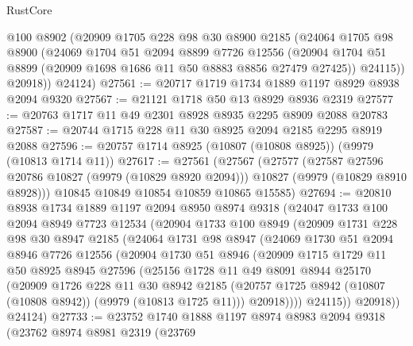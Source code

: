 \begin{lexlean}{RustCore}
\begin{coremodule}
        @100
        @8902
        (@20909
          @1705
          @228
          @98
          @30
          @8900
          @2185
          (@24064
            @1705
            @98
            @8900
            (@24069
              @1704
              @51
              @2094
              @8899
              @7726
              @12556
              (@20904 @1704 @51 @8899 (@20909 @1698 @1686 @11 @50 @8883 @8856 @27479 @27425))
              @24115))
          @20918))
      @24124)
@27561 := @20717 @1719 @1734 @1889 @1197 @8929 @8938 @2094 @9320
@27567 := @21121 @1718 @50 @13 @8929 @8936 @2319
@27577 := @20763 @1717 @11 @49 @2301 @8928 @8935 @2295 @8909 @2088 @20783
@27587 := @20744 @1715 @228 @11 @30 @8925 @2094 @2185 @2295 @8919 @2088
@27596 := @20757 @1714 @8925 (@10807 (@10808 @8925)) (@9979 (@10813 @1714 @11))
@27617 := @27561
    (@27567
      (@27577
        (@27587 @27596 @20786 @10827 (@9979 (@10829 @8920 @2094)))
        @10827
        (@9979 (@10829 @8910 @8928)))
      @10845
      @10849
      @10854
      @10859
      @10865
      @15585)
@27694 := @20810
    @8938
    @1734
    @1889
    @1197
    @2094
    @8950
    @8974
    @9318
    (@24047
      @1733
      @100
      @2094
      @8949
      @7723
      @12534
      (@20904
        @1733
        @100
        @8949
        (@20909
          @1731
          @228
          @98
          @30
          @8947
          @2185
          (@24064
            @1731
            @98
            @8947
            (@24069
              @1730
              @51
              @2094
              @8946
              @7726
              @12556
              (@20904
                @1730
                @51
                @8946
                (@20909
                  @1715
                  @1729
                  @11
                  @50
                  @8925
                  @8945
                  @27596
                  (@25156
                    @1728
                    @11
                    @49
                    @8091
                    @8944
                    @25170
                    (@20909
                      @1726
                      @228
                      @11
                      @30
                      @8942
                      @2185
                      (@20757 @1725 @8942 (@10807 (@10808 @8942)) (@9979 (@10813 @1725 @11)))
                      @20918))))
              @24115))
          @20918))
      @24124)
@27733 := @23752
    @1740
    @1888
    @1197
    @8974
    @8983
    @2094
    @9318
    (@23762
      @8974
      @8981
      @2319
      (@23769

\end{coremodule}
\end{lexlean}
